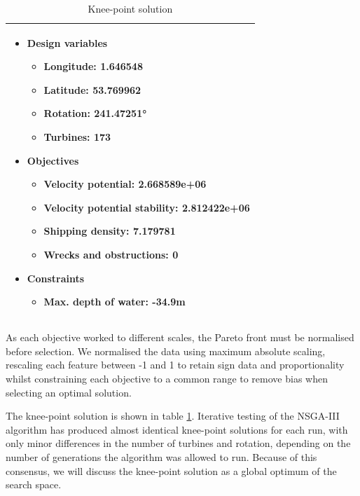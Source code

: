 \documentclass[preprint,12pt]{elsarticle}
\begin{document}
\begin{table}[h!]
    \centering
    \begin{tabular}{|p{}|}
        \hline
        \begin{itemize}
            \item Design variables
            \begin{itemize}
                \item Longitude: 1.646548
                \item Latitude: 53.769962
                \item Rotation: 241.47251°
                \item Turbines: 173
            \end{itemize}
            \item Objectives
            \begin{itemize}
                \item Velocity potential: 2.668589e+06
                \item Velocity potential stability: 2.812422e+06
                \item Shipping density: 7.179781
                \item Wrecks and obstructions: 0
            \end{itemize}
            \item Constraints
            \begin{itemize}
                \item Max. depth of water: -34.9m
            \end{itemize}
        \end{itemize} \\
        \hline
    \end{tabular}
    \caption{Knee-point solution}
    \label{table:kneepoint_solution}
\end{table}

As each objective worked to different scales, the Pareto front must be normalised before selection. We normalised the data using maximum absolute scaling, rescaling each feature between -1 and 1 to retain sign data and proportionality whilst constraining each objective to a common range to remove bias when selecting an optimal solution.

The knee-point solution is shown in table \ref{table:kneepoint_solution}. Iterative testing of the NSGA-III algorithm has produced almost identical knee-point solutions for each run, with only minor differences in the number of turbines and rotation, depending on the number of generations the algorithm was allowed to run. Because of this consensus, we will discuss the knee-point solution as a global optimum of the search space.
\end{document}

